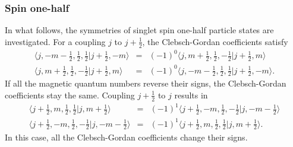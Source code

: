 \documentclass[rmp,amsfonts,showpacs,showkeys,preprint]{revtex4}
\begin{document}
\subsubsection{Spin one-half}%
In what follows, the symmetries of singlet spin one-half particle states are investigated.
For a coupling $j$ to $j+\frac{1}{2}$, the Clebsch-Gordan
coefficients satisfy
\begin{equation}
\begin{array}{rcl}
\langle
j,-m-\frac{1}{2},\frac{1}{2},\frac{1}{2}|j+\frac{1}{2},-m\rangle &=&(-1)^{0}\langle j,m+\frac{1}{2},\frac{1}{2},-\frac{1}{2}|j+\frac{1}{2},m\rangle\nonumber \\
\langle
j,m+\frac{1}{2},\frac{1}{2},-\frac{1}{2}|j+\frac{1}{2},m\rangle &=&(-1)^{0}\langle j,-m-\frac{1}{2},\frac{1}{2},\frac{1}{2}|j+\frac{1}{2},-m\rangle.
\end{array}
\end{equation}
If  all the magnetic quantum numbers reverse their signs, the
Clebsch-Gordan coefficients stay the same. Coupling
$j+\frac{1}{2}$ to $j$ results in
\begin{equation}
\begin{array}{rcl}
\langle
j+\frac{1}{2},m,\frac{1}{2},\frac{1}{2}|j,m+\frac{1}{2}\rangle &=&(-1)^{1}\langle j+\frac{1}{2},-m,\frac{1}{2},-\frac{1}{2}|j,-m-\frac{1}{2}\rangle\nonumber\\
\langle
j+\frac{1}{2},-m,\frac{1}{2},-\frac{1}{2}|j,-m-\frac{1}{2}\rangle  &=&(-1)^{1}\langle j+\frac{1}{2},m,\frac{1}{2},\frac{1}{2}|j,m+\frac{1}{2}\rangle.
\end{array}
\end{equation}
In this case, all the Clebsch-Gordan coefficients change their signs.
\end{document}
